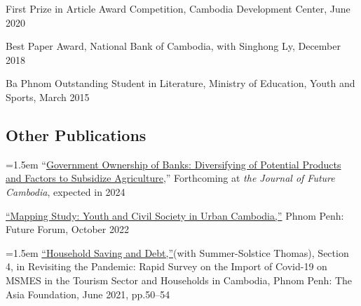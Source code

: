 \documentclass[10pt,a4paper]{article}
\begin{document}
	First Prize in Article Award Competition, Cambodia Development Center, June 2020 %
	
	Best Paper Award, National Bank of Cambodia, with Singhong Ly, December 2018 %
	
	Ba Phnom Outstanding Student in Literature, Ministry of Education, Youth and Sports, March 2015
	




\subsection*{Other Publications}

	\hangindent=1.5em
	“\href{https://kosalnith.github.io/research/papers/GOB.pdf}{Government Ownership of Banks: Diversifying of Potential Products and Factors to Subsidize Agriculture},” Forthcoming at \textit{the Journal of Future Cambodia}, expected in 2024 \\ \vspace{-.5em} 
	
	\href{}{``Mapping Study: Youth and Civil Society in Urban Cambodia,”} Phnom Penh: Future Forum, October 2022\\ \vspace{-.5em} 
	
	\hangindent=1.5em
	\href{https://kosalnith.github.io/research/policies/COVID-19-HHSavingsDebt.pdf}{``Household Saving and Debt,”}(with Summer-Solstice Thomas), Section 4, in Revisiting the Pandemic: Rapid Survey on the Import of Covid-19 on MSMES in the Tourism Sector and Households in Cambodia, Phnom Penh: The Asia Foundation, June 2021, pp.50--54\\ \vspace{-.5em} 
			
\end{document}
